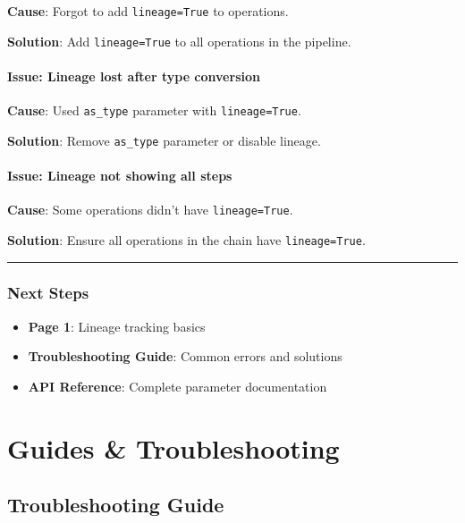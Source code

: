 \documentclass[
  letterpaper,
]{scrbook}
\providecommand{\tightlist}{%
  \setlength{\itemsep}{0pt}\setlength{\parskip}{0pt}}
\begin{document}
\textbf{Cause}: Forgot to add \texttt{lineage=True} to operations.

\textbf{Solution}: Add \texttt{lineage=True} to all operations in the
pipeline.

\subsection{Issue: Lineage lost after type
conversion}\label{issue-lineage-lost-after-type-conversion}

\textbf{Cause}: Used \texttt{as\_type} parameter with
\texttt{lineage=True}.

\textbf{Solution}: Remove \texttt{as\_type} parameter or disable
lineage.

\subsection{Issue: Lineage not showing all
steps}\label{issue-lineage-not-showing-all-steps}

\textbf{Cause}: Some operations didn't have \texttt{lineage=True}.

\textbf{Solution}: Ensure all operations in the chain have
\texttt{lineage=True}.

\begin{center}\rule{0.5\linewidth}{0.5pt}\end{center}

\section{Next Steps}\label{next-steps-20}

\begin{itemize}
\tightlist
\item
  \textbf{Page 1}: Lineage tracking basics
\item
  \textbf{Troubleshooting Guide}: Common errors and solutions
\item
  \textbf{API Reference}: Complete parameter documentation
\end{itemize}

\part{Guides \& Troubleshooting}

\chapter{Troubleshooting Guide}\label{troubleshooting-guide}
\end{document}
